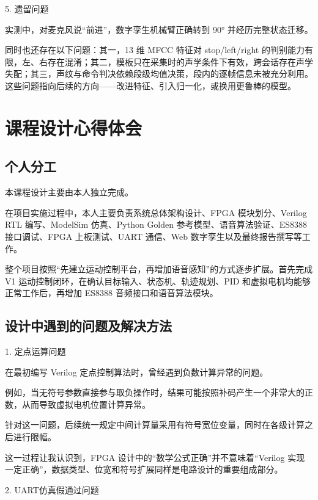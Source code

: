 \documentclass[UTF8,zihao=-4,fontset=windows]{ctexart}
\newcommand{\subhead}[1]{%
  \par\medskip
  {\heiti\zihao{-4}#1}
  \nopagebreak
  \par\smallskip
}
\begin{document}
\subhead{5. 遗留问题}

实测中，对麦克风说“前进”，数字孪生机械臂正确转到 90° 并经历完整状态迁移。

同时也还存在以下问题：其一，13 维 MFCC 特征对 stop/left/right 的判别能力有限，左、右存在混淆；其二，模板只在采集时的声学条件下有效，跨会话存在声学失配；其三，声纹与命令判决依赖段级均值决策，段内的逐帧信息未被充分利用。这些问题指向后续的方向——改进特征、引入归一化，或换用更鲁棒的模型。

\section{课程设计心得体会}

\subsection{个人分工}

本课程设计主要由本人独立完成。

在项目实施过程中，本人主要负责系统总体架构设计、FPGA 模块划分、Verilog RTL 编写、ModelSim 仿真、Python Golden 参考模型、语音算法验证、ES8388 接口调试、FPGA 上板测试、UART 通信、Web 数字孪生以及最终报告撰写等工作。

整个项目按照“先建立运动控制平台，再增加语音感知”的方式逐步扩展。首先完成 V1 运动控制闭环，在确认目标输入、状态机、轨迹规划、PID 和虚拟电机均能够正常工作后，再增加 ES8388 音频接口和语音算法模块。

\subsection{设计中遇到的问题及解决方法}

\subhead{1. 定点运算问题}

在最初编写 Verilog 定点控制算法时，曾经遇到负数计算异常的问题。

例如，当无符号参数直接参与取负操作时，结果可能按照补码产生一个非常大的正数，从而导致虚拟电机位置计算异常。

针对这一问题，后续统一规定中间计算量采用有符号宽位变量，同时在各级计算之后进行限幅。

这一过程让我认识到，FPGA 设计中的“数学公式正确”并不意味着“Verilog 实现一定正确”，数据类型、位宽和符号扩展同样是电路设计的重要组成部分。

\subhead{2. UART仿真假通过问题}
\end{document}
